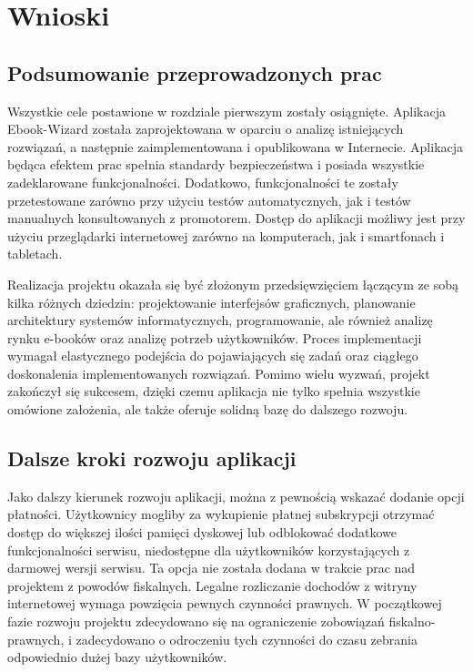 \chapter{Wnioski}
\label{sec:chapter7}

\section{Podsumowanie przeprowadzonych prac}

Wszystkie cele postawione w rozdziale pierwszym zostały osiągnięte. Aplikacja Ebook-Wizard została zaprojektowana w oparciu 
o analizę istniejących rozwiązań, a następnie zaimplementowana i opublikowana w Internecie. Aplikacja będąca efektem prac spełnia standardy bezpieczeństwa i posiada wszystkie zadeklarowane funkcjonalności. Dodatkowo, funkcjonalności te zostały przetestowane zarówno przy użyciu testów automatycznych, jak i testów manualnych konsultowanych z promotorem. Dostęp do aplikacji możliwy jest przy użyciu przeglądarki internetowej zarówno na komputerach, jak i smartfonach i tabletach.

Realizacja projektu okazała się być złożonym przedsięwzięciem łączącym ze sobą kilka różnych dziedzin: projektowanie interfejsów graficznych, planowanie architektury systemów informatycznych, programowanie, ale również analizę rynku e-booków oraz analizę potrzeb użytkowników. Proces implementacji wymagał elastycznego podejścia do pojawiających się zadań oraz ciągłego doskonalenia implementowanych rozwiązań. Pomimo wielu wyzwań, projekt zakończył się sukcesem, dzięki czemu aplikacja nie tylko spełnia wszystkie omówione założenia, ale także oferuje solidną bazę do dalszego rozwoju.

\section{Dalsze kroki rozwoju aplikacji}

Jako dalszy kierunek rozwoju aplikacji, można z pewnością wskazać dodanie opcji płatności. Użytkownicy mogliby za wykupienie płatnej subskrypcji otrzymać dostęp do większej ilości pamięci dyskowej lub odblokować dodatkowe funkcjonalności serwisu, niedostępne dla użytkowników korzystających z darmowej wersji serwisu. Ta opcja nie została dodana w trakcie prac nad projektem z powodów fiskalnych. Legalne rozliczanie dochodów z witryny internetowej wymaga powzięcia pewnych czynności prawnych. W początkowej fazie rozwoju projektu zdecydowano się na ograniczenie zobowiązań fiskalno-prawnych, i zadecydowano o odroczeniu tych czynności do czasu zebrania odpowiednio dużej bazy użytkowników.

